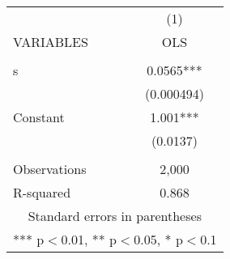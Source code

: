 \begin{tabular}{lc} \hline
 & (1) \\
VARIABLES & OLS \\ \hline
 &  \\
s & 0.0565*** \\
 & (0.000494) \\
Constant & 1.001*** \\
 & (0.0137) \\
 &  \\
Observations & 2,000 \\
 R-squared & 0.868 \\ \hline
\multicolumn{2}{c}{ Standard errors in parentheses} \\
\multicolumn{2}{c}{ *** p$<$0.01, ** p$<$0.05, * p$<$0.1} \\
\end{tabular}
